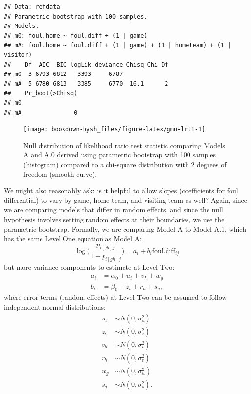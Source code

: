 \documentclass[
]{krantz}
\begin{document}
\begin{verbatim}
## Data: refdata
## Parametric bootstrap with 100 samples.
## Models:
## m0: foul.home ~ foul.diff + (1 | game)
## mA: foul.home ~ foul.diff + (1 | game) + (1 | hometeam) + (1 | visitor)
##    Df  AIC  BIC logLik deviance Chisq Chi Df
## m0  3 6793 6812  -3393     6787             
## mA  5 6780 6813  -3385     6770  16.1      2
##    Pr_boot(>Chisq)
## m0                
## mA               0
\end{verbatim}

\begin{figure}

{\centering \texttt{[image: bookdown-bysh\_files/figure-latex/gmu-lrt1-1]} 

}

\caption{Null distribution of likelihood ratio test statistic comparing Models A and A.0 derived using parametric bootstrap with 100 samples (histogram) compared to a chi-square distribution with 2 degrees of freedom (smooth curve).}\label{fig:gmu-lrt1}
\end{figure}

We might also reasonably ask: is it helpful to allow slopes (coefficients for foul differential) to vary by game, home team, and visiting team as well? Again, since we are comparing models that differ in random effects, and since the null hypothesis involves setting random effects at their boundaries, we use the parametric bootstrap. Formally, we are comparing Model A to Model A.1, which has the same Level One equation as Model A:
\[ \log\bigg(\frac{p_{i[gh]j}}{1-p_{i[gh]j}}\bigg)=a_{i}+b_{i}\mathrm{foul.diff}_{ij} \]
but more variance components to estimate at Level Two:
\begin{align*}
a_{i} & = \alpha_{0}+u_{i}+v_{h}+w_{g} \\
b_{i} & = \beta_{0}+z_{i}+r_{h}+s_{g},
\end{align*}
where error terms (random effects) at Level Two can be assumed to follow independent normal distributions:
\begin{align*}
u_{i} & \sim N \left( 0 , \sigma_{u}^{2} \right) \\
z_{i} & \sim N \left( 0 , \sigma_{z}^{2} \right) \\
v_{h} & \sim N \left( 0 , \sigma_{v}^{2} \right) \\
r_{h} & \sim N \left( 0 , \sigma_{r}^{2} \right) \\
w_{g} & \sim N \left( 0 , \sigma_{w}^{2} \right) \\
s_{g} & \sim N \left( 0 , \sigma_{s}^{2} \right).
\end{align*}
\end{document}
